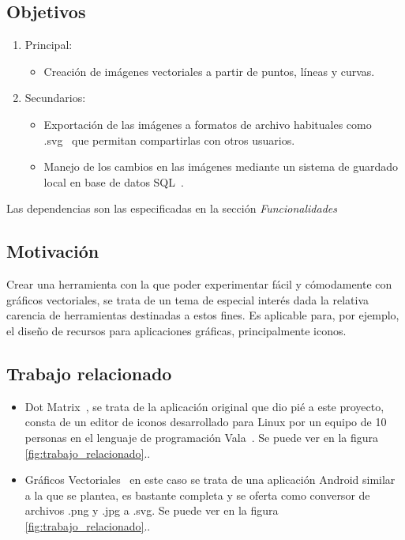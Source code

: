 \documentclass[a4paper,openright,12pt]{article}
\begin{document}
\subsection{Objetivos}
\begin{enumerate}
    \item Principal:
    \begin{itemize}
        \item Creación de imágenes vectoriales a partir de puntos, líneas y curvas.
    \end{itemize}

    \item Secundarios:
    \begin{itemize}
        \item Exportación de las imágenes a formatos de archivo habituales como \\
        .svg~\cite{SVG} que permitan compartirlas con otros usuarios.
        \item Manejo de los cambios en las imágenes mediante un sistema de guardado local en base de datos SQL~\cite{SQL}.
    \end{itemize}
\end{enumerate}

Las dependencias son las especificadas en la sección \emph{Funcionalidades}

\subsection{Motivación}
Crear una herramienta con la que poder experimentar fácil y cómodamente con gráficos vectoriales, se trata de un tema de especial interés dada la relativa carencia de herramientas destinadas a estos fines.
Es aplicable para, por ejemplo, el diseño de recursos para aplicaciones gráficas, principalmente iconos.

\subsection{Trabajo relacionado}
\begin{itemize}
    \item Dot Matrix~\cite{Dot_Matrix}, se trata de la aplicación original que dio pié a este proyecto, consta de un editor de iconos desarrollado para Linux por un equipo de 10 personas en el lenguaje de programación Vala~\cite{Vala}. Se puede ver en la figura \ref{fig:trabajo_relacionado}..
    \item Gráficos Vectoriales~\cite{Graficos_Vectoriales} en este caso se trata de una aplicación Android similar a la que se plantea, es bastante completa y se oferta como conversor de archivos .png y .jpg a .svg. Se puede ver en la figura \ref{fig:trabajo_relacionado}..
\end{itemize}
\end{document}
